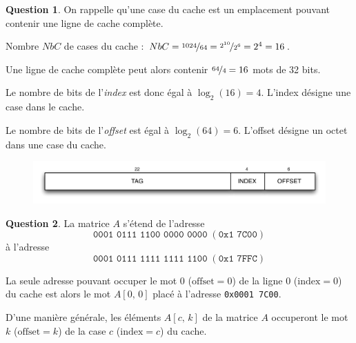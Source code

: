 \documentclass[11pt,english,french]{scrreprt}
\theoremstyle{remark}
\theoremstyle{definition}
\newtheorem{ques}{Question}[section]
\begin{document}
\begin{ques}
	On rappelle qu'une case du cache est un emplacement pouvant contenir une ligne de cache complète.
	
	Nombre $NbC$ de cases du cache : $NbC = \nicefrac{1024}{64}=\nicefrac{2^{10}}{2^6}=2^4=16$.
	
	Une ligne de cache complète peut alors contenir $\nicefrac{64}{4} = 16$ mots de 32 bits.
	
	Le nombre de bits de l'\emph{index} est donc égal à $\log_2(16) = 4$. L'index désigne une case dans le cache.
	
	Le nombre de bits de l'\emph{offset} est égal à $\log_2(64) = 6$. L'offset désigne un octet dans une case du cache.
	
	\begin{figure}[h]
		\center
		\includegraphics[scale=.9]{diagrammes/part-adresse}
	\end{figure}
\end{ques}

\begin{ques}
	La matrice $A$  s'étend de l'adresse
	\[\texttt{0001 0111 1100 0000 0000}\;(\texttt{0x1 7C00})\]
	à l'adresse
	\[\texttt{0001 0111 1111 1111 1100}\;(\texttt{0x1 7FFC})\]
	
	La seule adresse pouvant occuper le mot 0 ($\textrm{offset} = 0$) de la ligne 0 ($\textrm{index} = 0$) du cache est alors le mot $A[0,\,0]$ placé à l'adresse \texttt{0x0001 7C00}.
	
	D'une manière générale, les éléments $A[c,\,k]$ de la matrice $A$ occuperont le mot $k$ ($\mathrm{offset} = k$) de la case $c$ ($\mathrm{index} = c$) du cache.
\end{ques}
\end{document}
